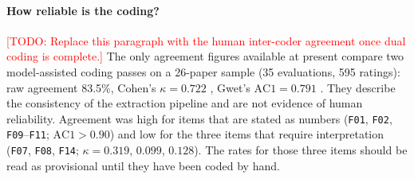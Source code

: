 \documentclass[pdflatex,sn-apa]{sn-jnl}
\newcommand{\todo}[1]{\textcolor{red}{[TODO: #1]}}
\begin{document}
\paragraph{How reliable is the coding?} \todo{Replace this paragraph with the human inter-coder agreement once dual coding is complete.} The only agreement figures available at present compare two model-assisted coding passes on a 26-paper sample (35 evaluations, 595 ratings): raw agreement 83.5\%, Cohen's $\kappa=0.722$ \citep{cohen1960coefficient}, Gwet's $\text{AC1}=0.791$ \citep{gwet2008computing}. They describe the consistency of the extraction pipeline and are not evidence of human reliability. Agreement was high for items that are stated as numbers (\texttt{F01}, \texttt{F02}, \texttt{F09}--\texttt{F11}; $\text{AC1}>0.90$) and low for the three items that require interpretation (\texttt{F07}, \texttt{F08}, \texttt{F14}; $\kappa=0.319$, $0.099$, $0.128$). The rates for those three items should be read as provisional until they have been coded by hand.
\end{document}
